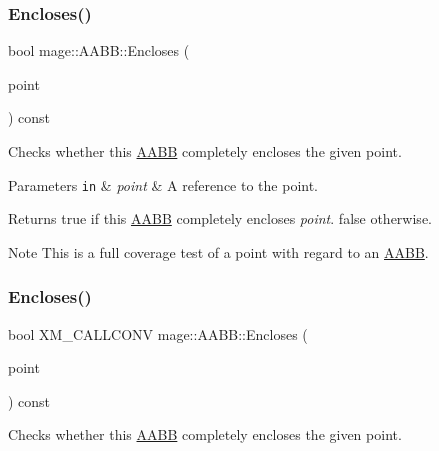 \subsubsection{\texorpdfstring{Encloses()}{Encloses()}\hspace{0.1cm}{\footnotesize\ttfamily [1/4]}}
{\footnotesize\ttfamily bool mage\+::\+A\+A\+B\+B\+::\+Encloses (\begin{DoxyParamCaption}\item[{const \hyperlink{structmage_1_1_point3}{Point3} \&}]{point }\end{DoxyParamCaption}) const\hspace{0.3cm}{\ttfamily [noexcept]}}

Checks whether this \hyperlink{structmage_1_1_a_a_b_b}{A\+A\+BB} completely encloses the given point.


\begin{DoxyParams}[1]{Parameters}
\mbox{\tt in}  & {\em point} & A reference to the point. \\
\hline
\end{DoxyParams}
\begin{DoxyReturn}{Returns}
{\ttfamily true} if this \hyperlink{structmage_1_1_a_a_b_b}{A\+A\+BB} completely encloses {\itshape point}. {\ttfamily false} otherwise. 
\end{DoxyReturn}
\begin{DoxyNote}{Note}
This is a full coverage test of a point with regard to an \hyperlink{structmage_1_1_a_a_b_b}{A\+A\+BB}. 
\end{DoxyNote}
\hypertarget{structmage_1_1_a_a_b_b_a97e3f57fc91e4fea04572382c94f4279}{}\label{structmage_1_1_a_a_b_b_a97e3f57fc91e4fea04572382c94f4279} 
\subsubsection{\texorpdfstring{Encloses()}{Encloses()}\hspace{0.1cm}{\footnotesize\ttfamily [2/4]}}
{\footnotesize\ttfamily bool X\+M\+\_\+\+C\+A\+L\+L\+C\+O\+NV mage\+::\+A\+A\+B\+B\+::\+Encloses (\begin{DoxyParamCaption}\item[{F\+X\+M\+V\+E\+C\+T\+OR}]{point }\end{DoxyParamCaption}) const\hspace{0.3cm}{\ttfamily [noexcept]}}

Checks whether this \hyperlink{structmage_1_1_a_a_b_b}{A\+A\+BB} completely encloses the given point.


